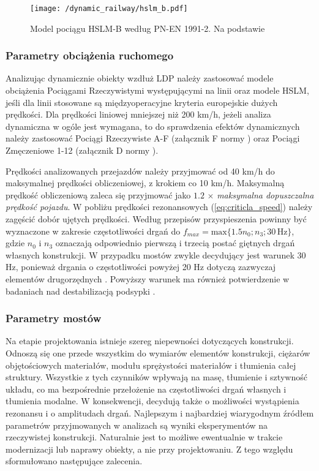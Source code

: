 \begin{figure}[hbt!]
	\centering
	\texttt{[image: /dynamic\_railway/hslm\_b.pdf]}
	\captionsetup{justification=centering}
	\caption{Model pociągu HSLM-B według PN-EN 1991-2. Na podstawie \cite{PKNj}}
	\label{fig:train_hslm_b}
\end{figure}





\subsubsection{Parametry obciążenia ruchomego}

Analizując dynamicznie obiekty wzdłuż LDP należy zastosować modele obciążenia Pociągami Rzeczywistymi występującymi na linii oraz modele HSLM, jeśli dla linii stosowane są międzyoperacyjne kryteria europejskie dużych prędkości. Dla prędkości liniowej mniejszej niż 200 km/h, jeżeli analiza dynamiczna w ogóle jest wymagana, to do sprawdzenia efektów dynamicznych należy zastosować Pociągi Rzeczywiste A-F (załącznik F normy \cite{PKNj}) oraz Pociągi Zmęczeniowe 1-12 (załącznik D normy \cite{PKNj}).

Prędkości analizowanych przejazdów należy przyjmować od 40 km/h do maksymalnej prędkości obliczeniowej, z krokiem co 10 km/h. Maksymalną prędkość obliczeniową zaleca się przyjmować jako $1.2\,\times\,$\textit{maksymalna dopuszczalna prędkość pojazdu}. W pobliżu prędkości rezonansowych (\ref{eq:criticla_speed}) należy zagęścić dobór ujętych prędkości. Według przepisów \parencite{PKNj,UnionInternationaleDesCheminsDeFer2009} przyspieszenia powinny być wyznaczone w zakresie częstotliwości drgań do $f_{max}=\text{max}\{1.5n_0;n_3; 30\,\text{Hz}\}$, gdzie $n_0$ i $n_3$ oznaczają odpowiednio pierwszą i trzecią postać giętnych drgań własnych konstrukcji. W przypadku mostów zwykle decydujący jest warunek 30 Hz, ponieważ drgania o częstotliwości powyżej 20 Hz dotyczą zazwyczaj elementów drugorzędnych \parencite{Oleszek2015b}. Powyższy warunek ma również potwierdzenie w badaniach nad destabilizacją podsypki \parencite{Zacher2008}.

\subsubsection{Parametry mostów}
Na etapie projektowania istnieje szereg niepewności dotyczących konstrukcji. Odnoszą się one przede wszystkim do wymiarów elementów konstrukcji, ciężarów objętościowych materiałów, modułu sprężystości materiałów i tłumienia całej struktury. Wszystkie z tych czynników wpływają na masę, tłumienie i sztywność układu, co ma bezpośrednie przełożenie na częstotliwości drgań własnych i tłumienia modalne. W konsekwencji, decydują także o możliwości wystąpienia rezonansu i o amplitudach drgań. Najlepszym i najbardziej wiarygodnym źródłem parametrów przyjmowanych w analizach są wyniki eksperymentów na rzeczywistej konstrukcji. Naturalnie jest to możliwe ewentualnie w trakcie modernizacji lub naprawy obiekty, a nie przy projektowaniu. Z tego względu sformułowano następujące zalecenia.

